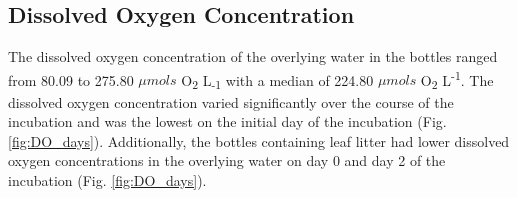 \subsection{Dissolved Oxygen Concentration}

The dissolved oxygen concentration of the overlying water in the bottles ranged from 80.09 to 275.80 $\mu mols$ O\textsubscript{2} L\textsubscript{-1} with a median of 224.80 $\mu mols$ O\textsubscript{2} L\textsuperscript{-1}.  The dissolved oxygen concentration varied significantly over the course of the incubation and was the lowest on the initial day of the incubation (Fig. \ref{fig:DO_days}). Additionally, the bottles containing leaf litter had lower dissolved oxygen concentrations in the overlying water on day 0 and day 2 of the incubation (Fig. \ref{fig:DO_days}). 




    